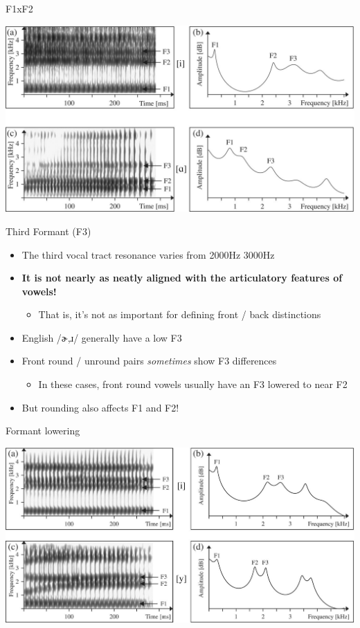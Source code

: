\documentclass[professionalfonts]{beamer}
\begin{document}
\begin{frame}{F1xF2}
    \begin{center}
        \includegraphics[width=\linewidth]{figs/rj-c10f001.jpeg}
    \end{center}
\end{frame}


\begin{frame}{Third Formant (F3)}
    \begin{itemize}
        \item The third vocal tract resonance varies from 2000Hz 3000Hz
        \item \textbf{It is not nearly as neatly aligned with the articulatory features of vowels!}
        \begin{itemize}
            \item That is, it’s not as important for defining front / back distinctions
        \end{itemize}
        \item English /ɚ,ɹ/ generally have a low F3
        \item Front round / unround pairs \textit{sometimes} show F3 differences
        \begin{itemize}
            \item In these cases, front round vowels usually have an F3 lowered to near F2
        \end{itemize}
        \item But rounding also affects F1 and F2!
    \end{itemize}
\end{frame}

\begin{frame}{Formant lowering}
    \begin{center}
        \includegraphics[width=\linewidth]{figs/rj-c10f003.jpeg}
    \end{center}
\end{frame}
\end{document}
